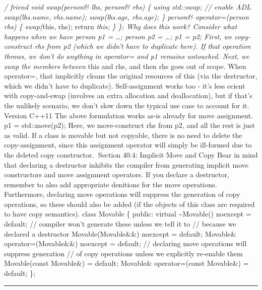 \emph{/ friend void swap(person\& lhs, person\& rhs) \{ using std::swap;
// enable ADL swap(lhs.name, rhs.name); swap(lhs.age, rhs.age); \}
person\& operator=(person rhs) \{ swap(}this, rhs); return \emph{this;
\} \}; Why does this work? Consider what happens when we have person p1
= \ldots; person p2 = \ldots; p1 = p2; First, we copy-construct rhs from
p2 (which we didn't have to duplicate here). If that operation throws,
we don't do anything in operator= and p1 remains untouched. Next, we
swap the members between }this and rhs, and then rhs goes out of scope.
When operator=, that implicitly cleans the original resources of this
(via the destructor, which we didn't have to duplicate). Self-assignment
works too - it's less ecient with copy-and-swap (involves an extra
allocation and deallocation), but if that's the unlikely scenario, we
don't slow down the typical use case to account for it. Version C++11
The above formulation works as-is already for move assignment. p1 =
std::move(p2); Here, we move-construct rhs from p2, and all the rest is
just as valid. If a class is movable but not copyable, there is no need
to delete the copy-assignment, since this assignment operator will
simply be ill-formed due to the deleted copy constructor. Section 40.4:
Implicit Move and Copy Bear in mind that declaring a destructor inhibits
the compiler from generating implicit move constructors and move
assignment operators. If you declare a destructor, remember to also add
appropriate denitions for the move operations. Furthermore, declaring
move operations will suppress the generation of copy operations, so
these should also be added (if the objects of this class are required to
have copy semantics). class Movable \{ public: virtual
\textasciitilde Movable() noexcept = default; // compiler won't generate
these unless we tell it to // because we declared a destructor
Movable(Movable\&\&) noexcept = default; Movable\&
operator=(Movable\&\&) noexcept = default; // declaring move operations
will suppress generation // of copy operations unless we explicitly
re-enable them Movable(const Movable\&) = default; Movable\&
operator=(const Movable\&) = default; \};

\begin{center}\rule{0.5\linewidth}{0.5pt}\end{center}
